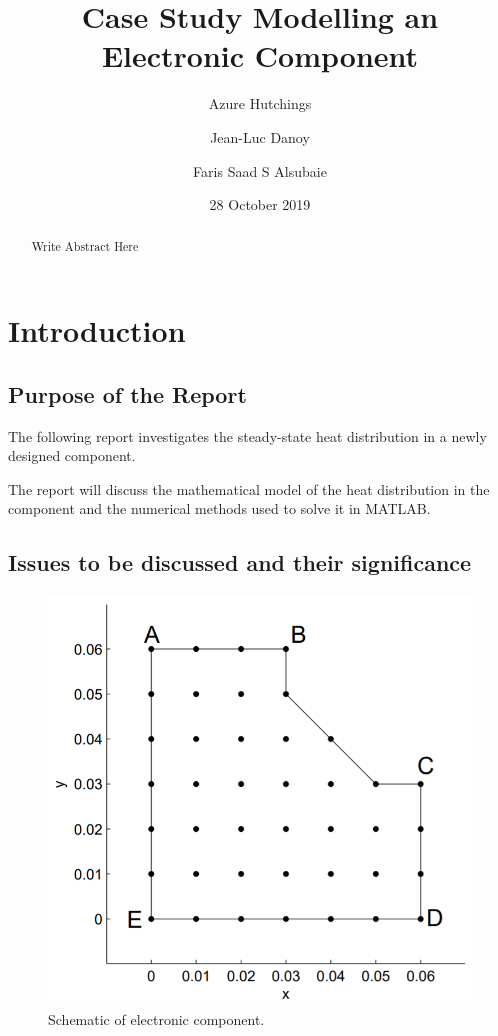 \documentclass[12pt,a4paper]{article}
\title{Case Study Modelling an Electronic Component}
\author{
  Azure Hutchings
  \and
  Jean-Luc Danoy
  \and
  Faris Saad S Alsubaie
}
\date{28 October 2019}
\begin{document}
 
\begin{titlepage}
\maketitle
\end{titlepage}

\renewcommand{\abstractname}{Executive Summary}
\begin{abstract}
Write Abstract Here
\end{abstract}

\pagebreak

\tableofcontents

\pagebreak

\section{Introduction}

\subsection{Purpose of the Report}
The following report investigates the steady-state heat distribution in a newly designed component. 

The report will discuss the mathematical model of the heat distribution in the component and the numerical methods used to solve it in MATLAB. 

\subsection{Issues to be discussed and their significance}

\begin{figure}[h!]
	\includegraphics[width=\linewidth]{images/Component.png}
	\caption{Schematic of electronic component.}
	\label{fig:componentSchematic}
\end{figure}
\end{document}
